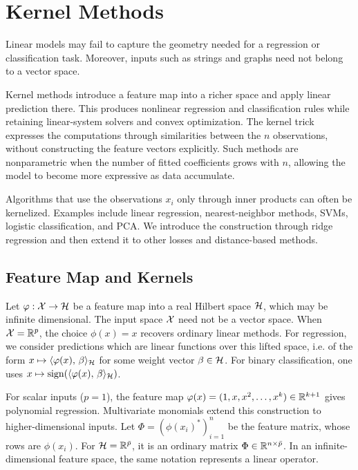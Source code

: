 \section{Kernel Methods}
\label{sec-kernel-methods}

Linear models may fail to capture the geometry needed for a regression or classification task. Moreover, inputs such as strings and graphs need not belong to a vector space.

Kernel methods introduce a feature map into a richer space and apply linear prediction there. This produces nonlinear regression and classification rules while retaining linear-system solvers and convex optimization. The kernel trick expresses the computations through similarities between the $n$ observations, without constructing the feature vectors explicitly. Such methods are nonparametric when the number of fitted coefficients grows with $n$, allowing the model to become more expressive as data accumulate.

Algorithms that use the observations $x_i$ only through inner products can often be kernelized. Examples include linear regression, nearest-neighbor methods, SVMs, logistic classification, and PCA. We introduce the construction through ridge regression and then extend it to other losses and distance-based methods.

\subsection{Feature Map and Kernels}

Let $\varphi : \mathcal{X} \rightarrow \mathcal{H}$ be a feature map into a real Hilbert space $\mathcal{H}$, which may be infinite dimensional.
%
The input space $\mathcal{X}$ need not be a vector space. When $\mathcal{X}=\mathbb{R}^p$, the choice $\phi(x)=x$ recovers ordinary linear methods.
%
For regression, we consider predictions which are linear functions over this lifted space, i.e. of the form $x \mapsto \langle \varphi(x),\,\beta\rangle_{\mathcal{H}}$ for some weight vector $\beta \in \mathcal{H}$. For binary classification, one uses $x \mapsto \operatorname{sign}(\langle \varphi(x),\,\beta\rangle_{\mathcal{H}})$.

For scalar inputs ($p=1$), the feature map $\varphi(x) = (1,x,x^2,\ldots,x^k)\in\mathbb{R}^{k+1}$ gives polynomial regression. Multivariate monomials extend this construction to higher-dimensional inputs.
%
Let $\Phi = ( \phi(x_i)^* )_{i=1}^n$ be the feature matrix, whose rows are $\phi(x_i)$. For $\mathcal{H}=\mathbb{R}^{\bar p}$, it is an ordinary matrix $\Phi \in \mathbb{R}^{n \times \bar p}$. In an infinite-dimensional feature space, the same notation represents a linear operator.

